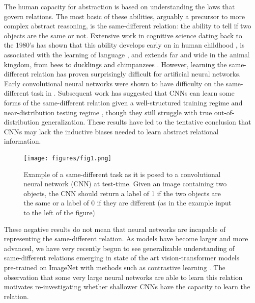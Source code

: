 \documentclass[10pt,letterpaper]{article}
\begin{document}
The human capacity for abstraction is based on  understanding the laws that govern relations. The most basic of these abilities, arguably a precursor to more complex abstract reasoning, is the same-different relation: the ability to tell if two objects are the same or not. Extensive work in cognitive science dating back to the 1980's \cite{premack1983codes} has shown that this ability develops early on in human childhood \cite{blote1999young}, is associated with the learning of language \cite{lupker2015there}, and extends far and wide in the animal kingdom, from bees to ducklings and chimpanzees \cite{gentner2021learning}. However, learning the same-different relation has proven surprisingly difficult for artificial neural networks. Early convolutional neural networks were shown to have difficulty on the same-different task in . Subsequent work has suggested that CNNs can learn some forms of the same-different relation given a well-structured training regime and near-distribution testing regime \cite{puebla2022can, geiger2020relational}, though they still struggle with true out-of-distribution generalization. These results have led to the tentative conclusion that CNNs may lack the inductive biases needed to learn abstract relational information. 

\begin{figure}[htb!]
    \centering
    \texttt{[image: figures/fig1.png]}
    \caption{Example of a same-different task as it is posed to a convolutional neural network (CNN) at test-time. Given an image containing two objects, the CNN should return a label of 1 if the two objects are the same or a label of 0 if they are different (as in the example input to the left of the figure)}
    \label{fig:cnn}
\end{figure}

These negative results do not mean that neural networks are incapable of representing the same-different relation. As models have become larger and more advanced, we have very recently begun to see generalizable understanding of same-different relations emerging in state of the art vision-transformer models pre-trained on ImageNet with methods such as contrastive learning \cite{dosovitskiy2020image, tartaglini2023deep}. The observation that some very large neural networks are able to learn this relation motivates re-investigating  whether shallower CNNs have the capacity to learn the relation. 
\end{document}
